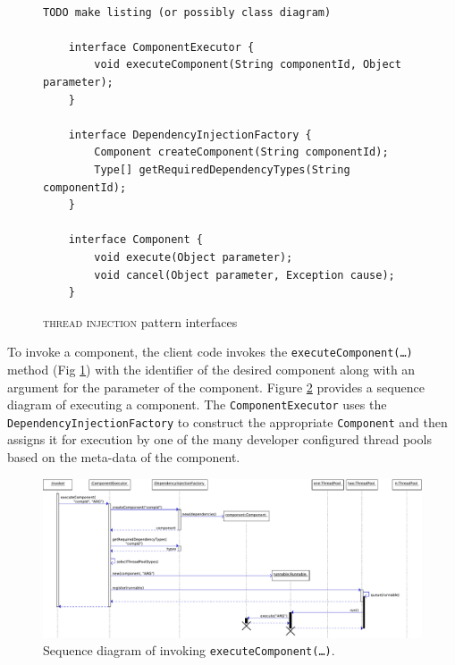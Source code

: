 \documentclass[prodmode]{style/acmlarge}
\begin{document}
\begin{figure}[tp]
\centering
\begin{verbatim}

TODO make listing (or possibly class diagram)

    interface ComponentExecutor {
        void executeComponent(String componentId, Object parameter);
    }

    interface DependencyInjectionFactory {
        Component createComponent(String componentId);
        Type[] getRequiredDependencyTypes(String componentId);
    }

    interface Component {
        void execute(Object parameter); 
        void cancel(Object parameter, Exception cause);
    }
\end{verbatim}
\caption{\textsc{thread injection} pattern interfaces\footnotemark}
\label{fig:ThreadInjectionInterfaces}
\end{figure}

To invoke a component, the client code invokes the
\texttt{executeComponent(\ldots)} method (Fig
\ref{fig:ThreadInjectionInterfaces}) with the identifier of the desired
component along with an argument for the parameter of the component.
Figure \ref{fig:ExecuteComponentSequenceDiagram} provides a sequence diagram of
executing a component.  The \texttt{ComponentExecutor} uses the
\texttt{DependencyInjectionFactory} to construct the appropriate
\texttt{Component} and then assigns it for execution by one of the many
developer configured thread pools based on the meta-data of the component.

\begin{figure}[!t]
\centering
\includegraphics[width=6in]{ExecuteComponentSequenceDiagram}
\caption{Sequence diagram of invoking \texttt{executeComponent(\ldots)}.}
\label{fig:ExecuteComponentSequenceDiagram}
\end{figure}
\end{document}
